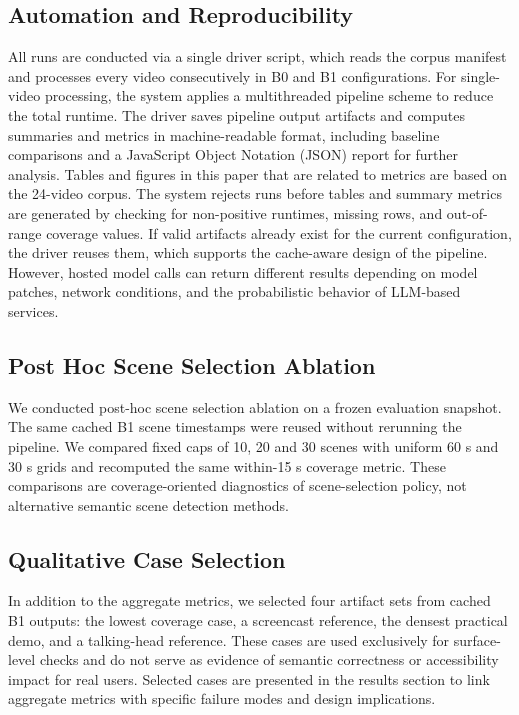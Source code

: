 \documentclass[conference]{IEEEtran}
\begin{document}
\subsection{Automation and Reproducibility}
All runs are conducted via a single driver script, which reads the corpus manifest and processes every video consecutively in B0 and B1 configurations. For single-video processing, the system applies a multithreaded pipeline scheme to reduce the total runtime. The driver saves pipeline output artifacts and computes summaries and metrics in machine-readable format, including baseline comparisons and a JavaScript Object Notation (JSON) report for further analysis. Tables and figures in this paper that are related to metrics are based on the 24-video corpus. The system rejects runs before tables and summary metrics are generated by checking for non-positive runtimes, missing rows, and out-of-range coverage values. If valid artifacts already exist for the current configuration, the driver reuses them, which supports the cache-aware design of the pipeline. However, hosted model calls can return different results depending on model patches, network conditions, and the probabilistic behavior of LLM-based services.

\subsection{Post Hoc Scene Selection Ablation}
We conducted post-hoc scene selection ablation on a frozen evaluation snapshot. The same cached B1 scene timestamps were reused without rerunning the pipeline. We compared fixed caps of 10, 20 and 30 scenes with uniform 60 s and 30 s grids and recomputed the same within-15 s coverage metric. These comparisons are coverage-oriented diagnostics of scene-selection policy, not alternative semantic scene detection methods.

\subsection{Qualitative Case Selection}
In addition to the aggregate metrics, we selected four artifact sets from cached B1 outputs: the lowest coverage case, a screencast reference, the densest practical demo, and a talking-head reference. These cases are used exclusively for surface-level checks and do not serve as evidence of semantic correctness or accessibility impact for real users. Selected cases are presented in the results section to link aggregate metrics with specific failure modes and design implications.
\end{document}
